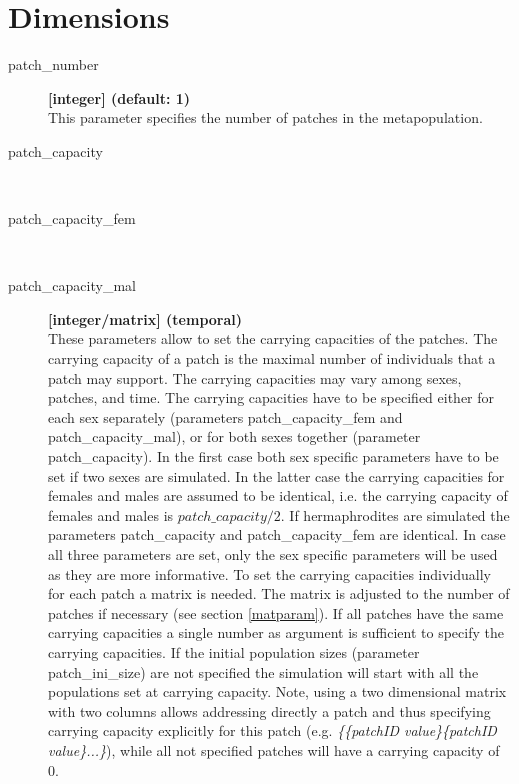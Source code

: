 \documentclass[letterpaper,12pt,oneside]{book}
\begin{document}
\section{Dimensions}
\begin{description}
\item[patch\_number] \textbf{[integer] (default: 1)}\\ 
This parameter specifies the number of patches in the metapopulation.

\item[patch\_capacity]\hspace*{\fill}\\
\vspace{-9mm}
\item[patch\_capacity\_fem]\hspace*{\fill}\\
\vspace{-9mm}
\item[patch\_capacity\_mal]\textbf{[integer/matrix] (temporal)}\\
These parameters allow to set the carrying capacities of the patches. The carrying capacity of a patch is the maximal number of individuals that a patch may support. The carrying capacities may vary among sexes, patches, and time. The carrying capacities have to be specified either for each sex separately (parameters \textsf{patch\_capacity\_fem} and \textsf{patch\_capacity\_mal}), or for both sexes together (parameter \textsf{patch\_capacity}). In the first case both sex specific parameters have to be set if two sexes are simulated. In the latter case the carrying capacities for females and males are assumed to be identical, i.e. the carrying capacity of females and males is $patch\_capacity/2$. If hermaphrodites are simulated the parameters \textsf{patch\_capacity} and \textsf{patch\_capacity\_fem} are identical. In case all three parameters are set, only the sex specific parameters will be used as they are more informative. To set the carrying capacities individually for each patch a matrix is needed. The matrix is adjusted to the number of patches if necessary (see section \ref{matparam}). If all patches have the same carrying capacities a single number as argument is sufficient to specify the carrying capacities. If the initial population sizes (parameter \textsf{patch\_ini\_size}) are not specified the simulation will start with all the populations set at carrying capacity. Note, using a two dimensional matrix with two columns allows addressing directly a patch and thus specifying carrying capacity explicitly for this patch (e.g. \textit{\{\{patchID value\}\{patchID value\}...\}}), while all not specified patches will have a carrying capacity of 0. 
\end{description}
\end{document}
